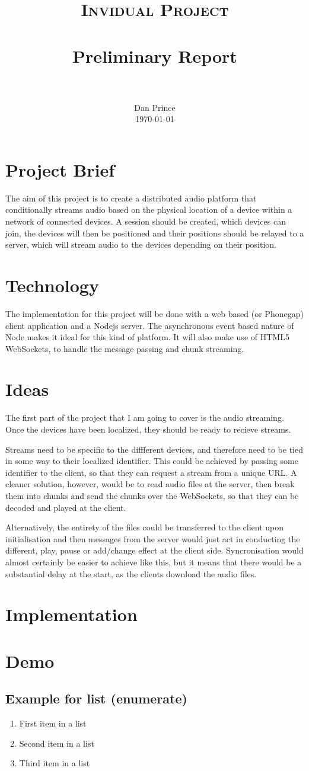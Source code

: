 \documentclass[paper=a4, fontsize=11pt]{scrartcl}
\title{
                \usefont{OT1}{bch}{b}{n}
                \normalfont \normalsize \textsc{Invidual Project} \\ [25pt]
                \horrule{0.5pt} \\[0.4cm]
                \huge Preliminary Report \\
                \horrule{0.5pt} \\[0.5cm]
}
\author{
                \normalfont                                                             \normalsize
        Dan Prince\\[-3pt]              \normalsize
        \today
}
\date{}
\numberwithin{equation}{section}                %
\numberwithin{figure}{section}                  %
\numberwithin{table}{section}                           %
\begin{document}
\maketitle
\section{Project Brief}
The aim of this project is to create a distributed audio platform that conditionally streams audio based on the physical location of a device within a network of connected devices. A session should be created, which devices can join, the devices will then be positioned and their positions should be relayed to a server, which will stream audio to the devices depending on their position.

\section{Technology}
The implementation for this project will be done with a web based (or Phonegap) client application and a Nodejs server. The asynchronous event based nature of Node makes it ideal for this kind of platform. It will also make use of HTML5 WebSockets, to handle the message passing and chunk streaming.


\section{Ideas}
The first part of the project that I am going to cover is the audio streaming. Once the devices have been localized, they should be ready to recieve streams.

Streams need to be specific to the diffferent devices, and therefore need to be tied in some way to their localized identifier. This could be achieved by passing some identifier to the client, so that they can request a stream from a unique URL. A cleaner solution, however, would be to read audio files at the server, then break them into chunks and send the chunks over the WebSockets, so that they can be decoded and played at the client.

Alternatively, the entirety of the files could be transferred to the client upon initialisation and then messages from the server would just act in conducting the different, play, pause or add/change effect at the client side. Syncronisation would almost certainly be easier to achieve like this, but it means that there would be a substantial delay at the start, as the clients download the audio files.


\section{Implementation}


\section{Demo}


\subsection{Example for list (enumerate)}
\begin{enumerate}
        \item First item in a list 
        \item Second item in a list 
        \item Third item in a list
\end{enumerate}
\end{document}
